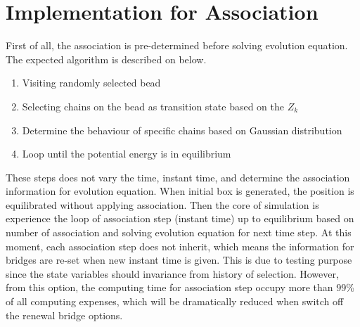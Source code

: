 \documentclass[10pt, a4paper]{report}
\begin{document}
\section{Implementation for Association}

First of all, the association is pre-determined before solving evolution equation. The expected algorithm is described on below.
\begin{enumerate}
\item Visiting randomly selected bead
\item Selecting chains on the bead as transition state based on the $Z_k$
\item Determine the behaviour of specific chains based on Gaussian distribution
\item Loop until the potential energy is in equilibrium
\end{enumerate}
These steps does not vary the time, instant time, and determine the association information for evolution equation. When initial box is generated, the position is equilibrated without applying association. Then the core of simulation is experience the loop of association step (instant time) up to equilibrium based on number of association and solving evolution equation for next time step. At this moment, each association step does not inherit, which means the information for bridges are re-set when new instant time is given. This is due to testing purpose since the state variables should invariance from history of selection. However, from this option, the computing time for association step occupy more than 99{\%} of all computing expenses, which will be dramatically reduced when switch off the renewal bridge options.
\end{document}
